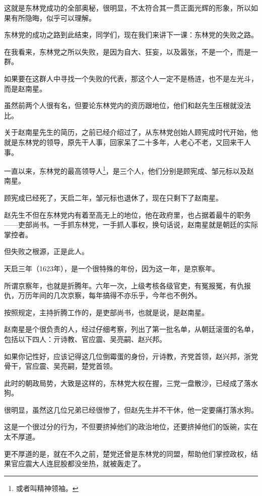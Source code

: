 	\begin{multicols}{\theparacolNo}
		\fi
		这就是东林党成功的全部奥秘，很明显，不太符合其一贯正面光辉的形象，所以如果有所隐晦，似乎可以理解。

		东林党的成功之路到此结束，同学们，现在我们来讲下一课：东林党的失败之路。

		在我看来，东林党之所以失败，是因为自大、狂妄，以及嚣张，不是一个，而是一群。

		如果要在这群人中寻找一个失败的代表，那这个人一定不是杨涟，也不是左光斗，而是赵南星。

		虽然前两个人很有名，但要论东林党内的资历跟地位，他们和赵先生压根就没法比。

		关于赵南星先生的简历，之前已经介绍过了，从东林党创始人顾宪成时代开始，他就是东林党的领导，原先干人事，回家呆了二十多年，人老心不老，又回来干人事。

		一直以来，东林党的最高领导人\footnote{或者叫精神领袖。}，是三个人，他们分别是顾宪成、邹元标以及赵南星。

		顾宪成已经死了，天启二年，邹元标也退休了，现在只剩下了赵南星。

		赵先生不但在东林党内有着至高无上的地位，他在政府里，也占据着最牛的职务——吏部尚书。一手抓东林党，一手抓人事权，换句话说，赵南星就是朝廷的实际掌控者。

		但失败之根源，正是此人。

		天启三年（1623年），是一个很特殊的年份，因为这一年，是京察年。

		所谓京察年，也就是折腾年。六年一次，上级考核各级官吏，有冤报冤，有仇报仇，万历年间的几次京察，每年搞得不亦乐乎，今年也不例外。

		按照规定，主持折腾工作的，是吏部尚书，也就是说，是赵南星。

		赵南星是个很负责的人，经过仔细考察，列出了第一批名单，从朝廷滚蛋的名单，包括以下四人：亓诗教、官应震、吴亮嗣、赵兴邦。

		如果你记性好，应该记得这几位倒霉蛋的身份，亓诗教，齐党首领，赵兴邦，浙党骨干，官应震、吴亮嗣，楚党首领。

		此时的朝政局势，大致是这样的，东林党大权在握，三党一盘散沙，已经成了落水狗。

		很明显，虽然这几位兄弟已经很惨了，但赵先生并不干休，他一定要痛打落水狗。

		这是一个很过分的行为，不但要挤掉他们的政治地位，还要挤掉他们的饭碗，实在太不厚道。

		更不厚道的是，就在不久之前，楚党还曾是东林党的同盟，帮助他们掌控政权，结果官应震大人连屁股都没坐热，就被轰走了。


\end{multicols}
